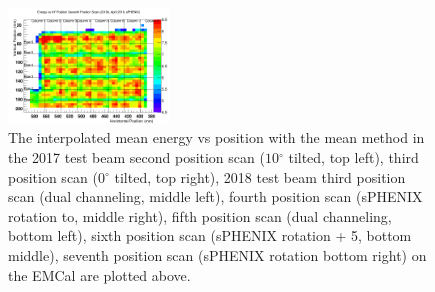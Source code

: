 \documentclass[hidelinks,11pt]{article}
\numberwithin{figure}{section}
\numberwithin{table}{section}
\newcommand{\degree}{\mbox{$^\circ$}\xspace}
\begin{document}
\begin{figure}[hbtp]
\begin{center}
\includegraphics[width=0.38\textwidth]{Plots/2018NoInterMean/EnPo20187thScan.png}
\caption{The interpolated mean energy vs position with the mean method in the 2017 test beam second position scan ($10 \degree$ tilted, top left), third position scan ($0 \degree$ tilted, top right), 2018 test beam third position scan (dual channeling, middle left), fourth position scan (sPHENIX rotation to, middle right), fifth position scan (dual channeling, bottom left), sixth position scan (sPHENIX rotation + 5, bottom middle),  seventh position scan (sPHENIX rotation bottom right) on the EMCal are plotted above.}
\label{fig:MeanWithLineMethods}
\end{center}
\end{figure} 
\end{document}
